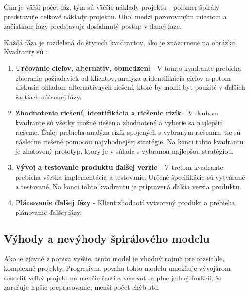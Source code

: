 \documentclass[10pt,twoside,slovak,a4paper]{article}
\begin{document}
Čím je väčší počet fáz, tým sú väčšie náklady projektu - polomer špirály predstavuje celkové náklady projektu. Uhol medzi pozorovaným miestom a začiatkom fázy predstavuje dosiahnutý postup v danej fáze. \cite{SpiralModelDef1}

Každá fáza je rozdelená do štyroch kvadrantov, ako je znázornené na obrázku. Kvadranty sú \cite{SpiralModelDef1}:
\begin{enumerate}
\item \textbf{Určovanie cieľov, alternatív, obmedzení } - V tomto kvadrante prebieha zbieranie požiadaviek od klientov, analýza a identifikácia cieľov a potom diskusia ohľadom alternatívnych riešení, ktoré by mohli byť použité v ďalších častiach súčasnej fázy.
\item \textbf{Zhodnotenie riešení, identifikácia a riešenie rizík } - V druhom kvadrante sú všetky možné riešenia zhodnotené a vyberie sa najlepšie riešenie. Ďalej prebieha analýza rizík spojených s vybraným riešením, tie sú následne riešené pomocou najvhodnejšej stratégie. Na konci tohto kvadrantu je zhotovený prototyp, ktorý je v súlade s vybranou najlepšou stratégiou.
\item \textbf{Vývoj a testovanie produktu ďalšej verzie} - V treťom kvadrante prebieha všetka implementácia a testovanie. Určené špecifikácie sú vytvárané a testované. Na konci tohto kvadrantu je pripravená ďalšia verzia produktu.
\item \textbf{Plánovanie ďalšej fázy} - Klient zhodnotí vytvorený produkt a prebieha plánovanie ďalšej fázy.
\end{enumerate}

\subsection{Výhody a nevýhody špirálového modelu} \label{prosCons:spiralModel}

Ako je zjavné z popisu vyššie, tento model je vhodný najmä pre rozsiahle, komplexné projekty. Progresívna povaha tohto modelu umožňuje vývojárom rozdeliť veľký projekt na menšie časti a venovať sa plne jednej funkcii, čo zaručuje lepšie prepracovanie, menší počet chýb atď. \cite{SpiralModelDef2} 
\end{document}

